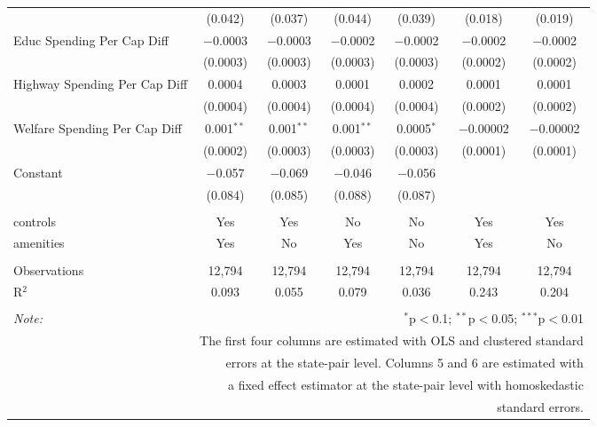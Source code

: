 \begin{table}[!htbp]
\begin{tabular}{@{\extracolsep{5pt}}lcccccc}
  & (0.042) & (0.037) & (0.044) & (0.039) & (0.018) & (0.019) \\ 
  Educ Spending Per Cap Diff & $-$0.0003 & $-$0.0003 & $-$0.0002 & $-$0.0002 & $-$0.0002 & $-$0.0002 \\ 
  & (0.0003) & (0.0003) & (0.0003) & (0.0003) & (0.0002) & (0.0002) \\ 
  Highway Spending Per Cap Diff & 0.0004 & 0.0003 & 0.0001 & 0.0002 & 0.0001 & 0.0001 \\ 
  & (0.0004) & (0.0004) & (0.0004) & (0.0004) & (0.0002) & (0.0002) \\ 
  Welfare Spending Per Cap Diff & 0.001$^{**}$ & 0.001$^{**}$ & 0.001$^{**}$ & 0.0005$^{*}$ & $-$0.00002 & $-$0.00002 \\ 
  & (0.0002) & (0.0003) & (0.0003) & (0.0003) & (0.0001) & (0.0001) \\ 
  Constant & $-$0.057 & $-$0.069 & $-$0.046 & $-$0.056 &  &  \\ 
  & (0.084) & (0.085) & (0.088) & (0.087) &  &  \\ 
 \hline \\[-1.8ex] 
controls & Yes & Yes & No & No & Yes & Yes \\ 
amenities & Yes & No & Yes & No & Yes & No \\ 
\hline \\[-1.8ex] 
Observations & 12,794 & 12,794 & 12,794 & 12,794 & 12,794 & 12,794 \\ 
R$^{2}$ & 0.093 & 0.055 & 0.079 & 0.036 & 0.243 & 0.204 \\ 
\hline 
\hline \\[-1.8ex] 
\textit{Note:}  & \multicolumn{6}{r}{$^{*}$p$<$0.1; $^{**}$p$<$0.05; $^{***}$p$<$0.01} \\ 
 & \multicolumn{6}{r}{The first four columns are estimated with OLS and clustered standard} \\ 
 & \multicolumn{6}{r}{ errors at the state-pair level. Columns 5 and 6 are estimated with} \\ 
 & \multicolumn{6}{r}{a fixed effect estimator at the state-pair level with homoskedastic} \\ 
 & \multicolumn{6}{r}{standard errors.} \\ 
\end{tabular} 
\end{table} 
